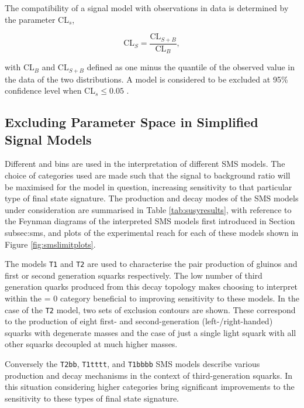 The compatibility of a signal model with observations in data is determined by the parameter CL$_{s}$,

\begin{equation}
\text{CL$_{S}$} = \frac{\text{CL$_{S+B}$}}{\text{CL$_{B}$}},
\end{equation}

with CL$_{B}$ and CL$_{S+B}$ defined as one minus the quantile of the observed value in the data of the two distributions. A model is considered to be excluded at 95\% confidence level when CL$_{s} \leq 0.05$ \cite{2011EPJClimits}.

\subsection{Excluding Parameter Space in Simplified Signal Models}

Different \njet and \nbreco bins are used in the interpretation of different \ac{SMS} models. The choice of categories used are made such that the signal to background ratio will be maximised for the model in question, increasing sensitivity to that particular type of final state signature. The production and decay modes of the \ac{SMS} models under consideration are summarised in Table \ref{tab:susyresults}, with reference to the Feynman diagrams of the interpreted \ac{SMS} models first introduced in Section {subsec:sms}, and plots of the experimental reach for each of these models shown in Figure \ref{fig:smslimitplots}.

The models \texttt{T1} and \texttt{T2} are used to characterise the pair production of gluinos and first or second generation squarks respectively. The low number of third generation quarks produced from this decay topology makes choosing to interpret within the \nbreco = 0 category beneficial to improving sensitivity to these models. In the case of the \texttt{T2} model, two sets of exclusion contours are shown. These correspond to the production of eight first- and second-generation (left-/right-handed) squarks with degenerate masses and the case of just a single light squark with all other squarks decoupled at much higher masses.

Conversely the \texttt{T2bb}, \texttt{T1tttt}, and \texttt{T1bbbb} \ac{SMS} models describe various production and decay mechanisms in the context of third-generation squarks. In this situation considering higher \nbreco categories bring significant improvements to the sensitivity to these types of final state signature. 

